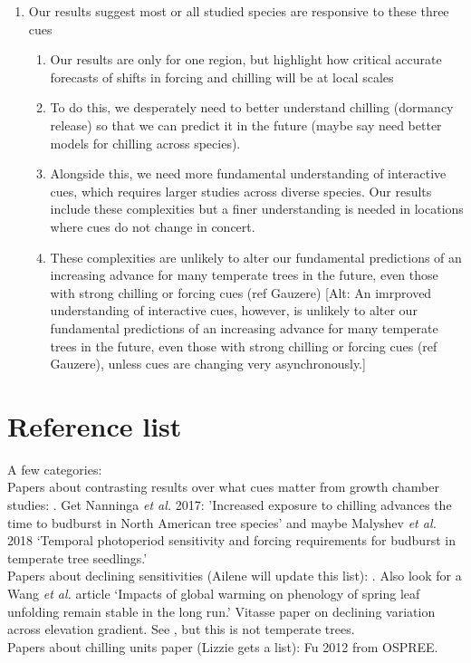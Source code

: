 \documentclass[11pt,letter]{article}
\begin{document}
\begin{enumerate}
\begin{enumerate}
\end{enumerate}
\item Our results suggest most or all studied species are responsive to these three cues
\begin{enumerate}
\item Our results are only for one region, but highlight how critical accurate forecasts of shifts in forcing and chilling will be at local scales
\item To do this, we desperately need to better understand chilling (dormancy release) so that we can predict it in the future (maybe say need better models for chilling across species). 
\item Alongside this, we need more fundamental understanding of interactive cues, which requires larger studies across diverse species. Our results include these complexities but a finer understanding is needed in locations where cues do not change in concert.
\item These complexities are unlikely to alter our fundamental predictions of an increasing advance for many temperate trees in the future, even those with strong chilling or forcing cues (ref Gauzere) [Alt: An imrproved understanding of interactive cues, however, is unlikely to alter our fundamental predictions of an increasing advance for many temperate trees in the future, even those with strong chilling or forcing cues (ref Gauzere), unless cues are changing very asynchronously.]
\end{enumerate}
\end{enumerate}

\section{Reference list}

A few categories:\\

Papers about contrasting results over what cues matter from growth chamber studies: \cite{Basler:2012,Basler:2014aa,Caffarra:2011qf,Caffarra:2011a,Caffarra:2011b,Heide:2005aa,koerner2010b,Laube:2014a,vitasse2013,zohner2016}. Get Nanninga \emph{et al.} 2017: 'Increased exposure to chilling advances the time to budburst in North American tree species' and maybe Malyshev \emph{et al.} 2018 `Temporal photoperiod sensitivity and forcing requirements for budburst in temperate tree seedlings.'\\

Papers about declining sensitivities (Ailene will update this list): \cite{Rutishauser:2008fu,fu2015}. Also look for a Wang \emph{et al.} article `Impacts of global warming on phenology of spring leaf unfolding remain stable in the long run.' Vitasse paper on declining variation across elevation gradient. See \cite{yu2010}, but this is not temperate trees. \\

Papers about chilling units paper (Lizzie gets a list): Fu 2012 from OSPREE. \cite{harrington2015}\cite{lued2011,Luedeling:2011qe,Luedeling2013AgFM}\\


\end{document}
